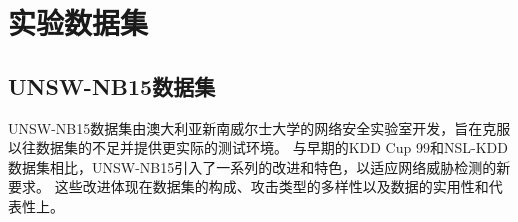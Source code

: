 
\section{实验数据集}
\subsection{UNSW-NB15数据集\cite{moustafa2015comprehensive}}
UNSW-NB15数据集由澳大利亚新南威尔士大学的网络安全实验室开发，旨在克服以往数据集的不足并提供更实际的测试环境。
与早期的KDD Cup 99和NSL-KDD数据集相比，UNSW-NB15引入了一系列的改进和特色，以适应网络威胁检测的新要求。
这些改进体现在数据集的构成、攻击类型的多样性以及数据的实用性和代表性上。

